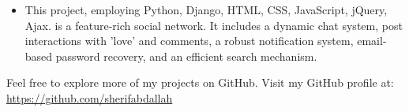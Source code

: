 \documentclass[10pt,a4paper,ragged2e,withhyper]{altacv}
\begin{document}
\begin{paracol}{2}
\begin{itemize}
\item This project, employing Python, Django, HTML, CSS, JavaScript, jQuery, Ajax. is a feature-rich social network. It includes a dynamic chat system, post interactions with 'love' and comments, a robust notification system, email-based password recovery, and an efficient search mechanism.


\end{itemize}

\divider






Feel free to explore more of my projects on GitHub. Visit my GitHub profile at: \url {https://github.com/sherifabdallah}





\switchcolumn




\switchcolumn




\end{paracol}
\end{document}
